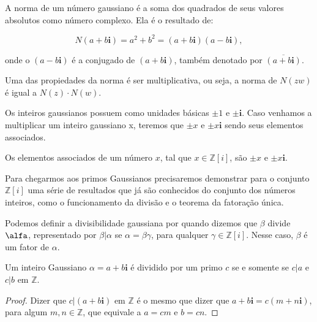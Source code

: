 \begin{Df}
A norma de um n\'umero gaussiano \'e a soma dos quadrados de seus valores absolutos como n\'umero complexo. Ela \'e o resultado de:

$$N(a+b\textbf{i}) = a^2 + b^2 = (a+b\textbf{i})(a-b\textbf{i}),$$

onde o $(a-b\textbf{i})$ \'e a conjugado de $(a+b\textbf{i})$, tamb\'em denotado por $\overline{(a+b\textbf{i})}$.
\end{Df}

Uma das propiedades da norma \'e ser multiplicativa, ou seja, a norma de $N(zw)$ \'e igual a $N(z) \cdot N(w)$.

Os inteiros gaussianos possuem como unidades b\'asicas $\pm 1$ e $\pm \textbf{i}$. Caso venhamos a multiplicar um inteiro gaussiano x, teremos que $\pm x$ e $\pm x\textbf{i}$ sendo seus elementos associados.

\begin{Df}

Os elementos associados de um n\'umero $x$, tal que $x \in \mathbb{Z}[i]$, s\~ao $\pm x$ e $\pm x\textbf{i}$.

\end{Df}

Para chegarmos aos primos Gaussianos precisaremos demonstrar para o conjunto $\mathbb{Z}[i]$ uma s\'erie de resultados que j\'a s\~ao conhecidos do conjunto dos n\'umeros inteiros, como o funcionamento da divis\~ao e o teorema da fatora\c{c}\~ao \'unica.

Podemos definir a divisibilidade gaussiana por quando dizemos que $\beta$ divide $\alfa$, representado por $\beta | \alpha$ se $\alpha = \beta \gamma$, para qualquer $\gamma \in \mathbb{Z}[i] $. Nesse caso, $\beta$ \'e um fator de $\alpha$.

\begin{Th}\label{div_gaussiana1}

Um inteiro Gaussiano $\alpha = a+b\textbf{i}$ \'e dividido por um primo $c$ se e somente se $c|a$ e $c|b$ em $\mathbb{Z}$.

\end{Th}

\begin{proof}

Dizer que $c|(a+b\textbf{i})$ em $\mathbb{Z}$ \'e o mesmo que dizer que $a+b\textbf{i} = c(m +  n\textbf{i})$, para algum $m, n \in \mathbb{Z}$, que equivale a $a=cm$ e $b=cn$.

\end{proof}

